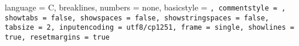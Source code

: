 

\usepackage{changepage}
\usepackage{listingsutf8}

\lstset
{
    language = C,
	breaklines,
	numbers = none,
    basicstyle = \tt\fontsize{12pt}{12pt}\selectfont,
    commentstyle = ,
    showtabs = false, 
    showspaces = false,
    showstringspaces = false,
    tabsize = 2,
    inputencoding = utf8/cp1251,
	frame = single,
	showlines = true,
	resetmargins = true
}

\renewcommand{\thelstcon}{\arabic{section}.\arabic{lstcon}}


%
%
%
%

\newcommand{\mylistingcaption}{}
\newcommand{\mylistinglabel}{}

\newcommand{\mylistingbegin}[2]
{
	\refstepcounter{lstcon}
	\renewcommand{\mylistingcaption}{\vbox{\small \centering Листинг~\thelstcon~---~#2}}
	\renewcommand{\mylistinglabel}{\label{listing:#1}}
	\begin{adjustwidth}{-\leftmargin}{\rightmargin}
}

\newcommand{\mylistingend}
{
	\mylistingcaption
	\mylistinglabel
	\end{adjustwidth}
	\medskip
}


%
%
%
\newcommand{\mysource}[3]
{
	\refstepcounter{lstcon}
	\label{listing:#2}
	{
		
		\nopagebreak
			
		\vbox{\small \centering Листинг~\thelstcon~---~#3}
		\bigskip
	}
}

